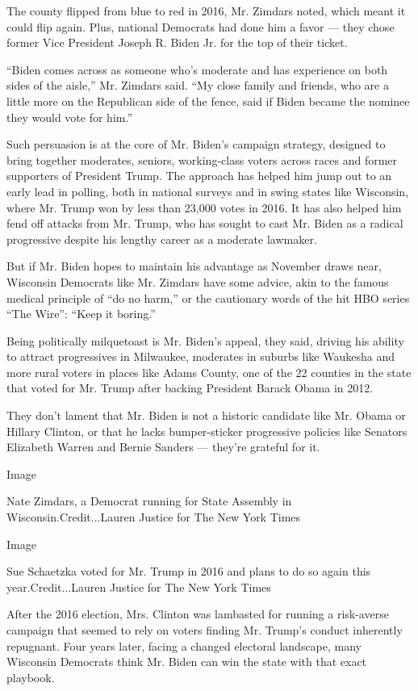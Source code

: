 The county flipped from blue to red in 2016, Mr. Zimdars noted, which
meant it could flip again. Plus, national Democrats had done him a favor
--- they chose former Vice President Joseph R. Biden Jr. for the top of
their ticket.

``Biden comes across as someone who's moderate and has experience on
both sides of the aisle,'' Mr. Zimdars said. ``My close family and
friends, who are a little more on the Republican side of the fence, said
if Biden became the nominee they would vote for him.''

Such persuasion is at the core of Mr. Biden's campaign strategy,
designed to bring together moderates, seniors, working-class voters
across races and former supporters of President Trump. The approach has
helped him jump out to an early lead in polling, both in national
surveys and in swing states like Wisconsin, where Mr. Trump won by less
than 23,000 votes in 2016. It has also helped him fend off attacks from
Mr. Trump, who has sought to cast Mr. Biden as a radical progressive
despite his lengthy career as a moderate lawmaker.

But if Mr. Biden hopes to maintain his advantage as November draws near,
Wisconsin Democrats like Mr. Zimdars have some advice, akin to the
famous medical principle of ``do no harm,'' or the cautionary words of
the hit HBO series ``The Wire'': ``Keep it boring.''

Being politically milquetoast is Mr. Biden's appeal, they said, driving
his ability to attract progressives in Milwaukee, moderates in suburbs
like Waukesha and more rural voters in places like Adams County, one of
the 22 counties in the state that voted for Mr. Trump after backing
President Barack Obama in 2012.

They don't lament that Mr. Biden is not a historic candidate like Mr.
Obama or Hillary Clinton, or that he lacks bumper-sticker progressive
policies like Senators Elizabeth Warren and Bernie Sanders --- they're
grateful for it.

Image

Nate Zimdars, a Democrat running for State Assembly in
Wisconsin.Credit...Lauren Justice for The New York Times

Image

Sue Schaetzka voted for Mr. Trump in 2016 and plans to do so again this
year.Credit...Lauren Justice for The New York Times

After the 2016 election, Mrs. Clinton was lambasted for running a
risk-averse campaign that seemed to rely on voters finding Mr. Trump's
conduct inherently repugnant. Four years later, facing a changed
electoral landscape, many Wisconsin Democrats think Mr. Biden can win
the state with that exact playbook.

